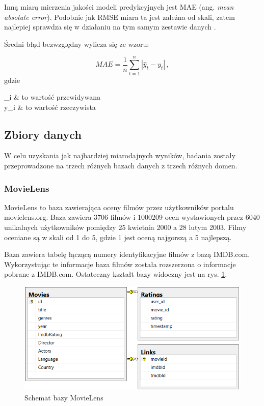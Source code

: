 \documentclass[twoside]{iisthesis}
\begin{document}
		Inną miarą mierzenia jakości modeli predykcyjnych jest MAE (ang. \textit{mean absolute error}). Podobnie jak RMSE miara ta jest zależna od skali, zatem najlepiej sprawdza się w działaniu na tym samym zestawie danych \cite{hyndman2006another}. 
		
		Średni błąd bezwzględny wylicza się ze wzoru:
		
		\begin{equation}
		\label{eq:mae}
		MAE = \frac{1}{n} \sum_{t=1}^{n} |\hat{y}_t - y_t|
		\,,
		\end{equation}		
		gdzie
		
		\begin{conditions*}
			_i & to wartość przewidywana \\
			y_i  &  to wartość rzeczywista
		\end{conditions*} 
	
	
		\subsection{Zbiory danych}
		
		W celu uzyskania jak najbardziej miarodajnych wyników, badania zostały przeprowadzone na trzech różnych bazach danych z trzech różnych domen. 
		
		\subsubsection{MovieLens}
		MovieLens \cite{harper2016movielens} to baza zawierająca oceny filmów przez użytkowników portalu movielens.org. Baza zawiera 3706 filmów i 1000209 ocen wystawionych przez 6040 unikalnych użytkowników pomiędzy 25 kwietnia 2000 a 28 lutym 2003. Filmy oceniane są w skali od 1 do 5, gdzie 1 jest oceną najgorszą a 5 najlepszą. 
		
		Baza zawiera tabelę łączącą numery identyfikacyjne filmów z bazą IMDB.com. Wykorzystując te informacje baza filmów została rozszerzona o informacje pobrane z IMDB.com. Ostateczny kształt bazy widoczny jest na rys. \ref{fig:movielens_schema}.
		
			\begin{figure}[!ht] 
				\centering
				\includegraphics[width=1\textwidth]{movielens}
				\caption{Schemat bazy MovieLens}
				\label{fig:movielens_schema}
			\end{figure}
		
\end{document}
